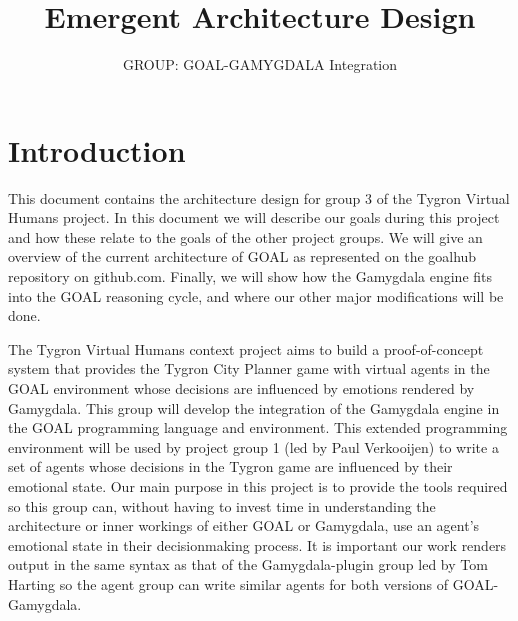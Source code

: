 \documentclass[]{article}
\title{Emergent Architecture Design}
\author{GROUP: GOAL-GAMYGDALA Integration}
\begin{document}
\maketitle

\section{Introduction}
This document contains the architecture design for group 3 of the Tygron Virtual Humans project. In this document we will describe our goals during this project and how these relate to the goals of the other project groups. We will give an overview of the current architecture of GOAL as represented on the goalhub repository on github.com. Finally, we will show how the Gamygdala engine fits into the GOAL reasoning cycle, and where our other major modifications will be done.

The Tygron Virtual Humans context project aims to build a proof-of-concept system that provides the \gls{Tygron City Planner} game with virtual agents in the GOAL environment whose decisions are influenced by emotions rendered by Gamygdala. This group will develop the integration of the \gls{Gamygdala} engine in the \gls{GOAL} programming language and environment. This extended programming environment will be used by project group 1 (led by Paul Verkooijen) to write a set of agents whose decisions in the Tygron game are influenced by their emotional state. Our main purpose in this project is to provide the tools required so this group can, without having to invest time in understanding the architecture or inner workings of either GOAL or Gamygdala, use an agent's emotional state in their decisionmaking process. It is important our work renders output in the same syntax as that of the Gamygdala-plugin group led by Tom Harting so the agent group can write similar agents for both versions of GOAL-Gamygdala.
\newpage
\end{document}
